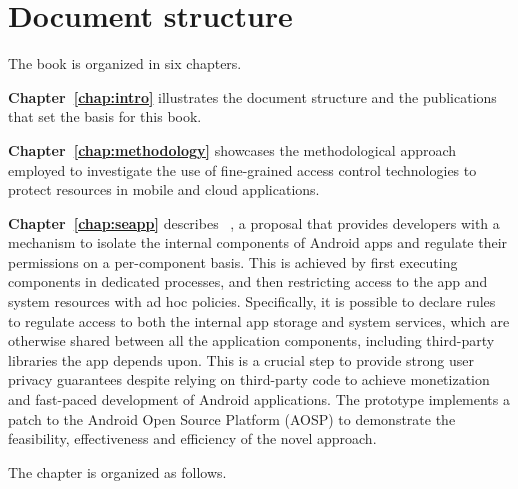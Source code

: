 \section{Document structure}

The book is organized in six chapters.

\textbf{Chapter~\ref{chap:intro}} illustrates the document
structure and the publications that set the basis for this book.

\textbf{Chapter~\ref{chap:methodology}} showcases the
methodological approach employed to investigate the use of
fine-grained access control technologies to protect resources in
mobile and cloud applications.

\textbf{Chapter~\ref{chap:seapp}} describes \seapp~\cite{seapp}, a
proposal that provides developers with a mechanism to isolate the
internal components of Android apps and regulate their permissions on
a per-component basis. This is achieved by first executing components
in dedicated processes, and then restricting access to the app and
system resources with ad hoc \sel policies. Specifically, it is
possible to declare rules to regulate access to both the internal app
storage and system services, which are otherwise shared between all
the application components, including third-party libraries the app
depends upon. This is a crucial step to provide strong user privacy
guarantees despite relying on third-party code to achieve monetization
and fast-paced development of Android applications. The prototype
implements a patch to the Android Open Source Platform (AOSP) to
demonstrate the feasibility, effectiveness and efficiency of the novel
approach.

\smallskip
\noindent The chapter is organized as follows.

